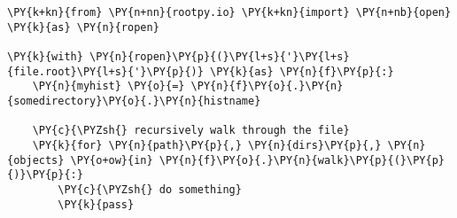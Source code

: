 \begin{Verbatim}[commandchars=\\\{\}]
\PY{k+kn}{from} \PY{n+nn}{rootpy.io} \PY{k+kn}{import} \PY{n+nb}{open} \PY{k}{as} \PY{n}{ropen}

\PY{k}{with} \PY{n}{ropen}\PY{p}{(}\PY{l+s}{'}\PY{l+s}{file.root}\PY{l+s}{'}\PY{p}{)} \PY{k}{as} \PY{n}{f}\PY{p}{:}
    \PY{n}{myhist} \PY{o}{=} \PY{n}{f}\PY{o}{.}\PY{n}{somedirectory}\PY{o}{.}\PY{n}{histname}

    \PY{c}{\PYZsh{} recursively walk through the file}
    \PY{k}{for} \PY{n}{path}\PY{p}{,} \PY{n}{dirs}\PY{p}{,} \PY{n}{objects} \PY{o+ow}{in} \PY{n}{f}\PY{o}{.}\PY{n}{walk}\PY{p}{(}\PY{p}{)}\PY{p}{:}
        \PY{c}{\PYZsh{} do something}
        \PY{k}{pass}
\end{Verbatim}
